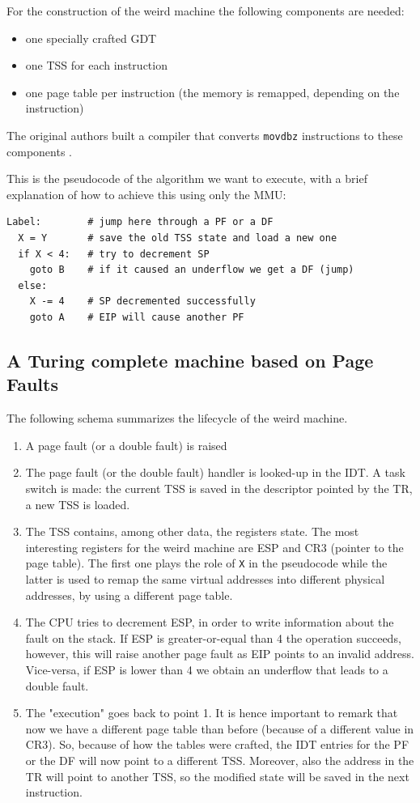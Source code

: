 \documentclass[11pt,twoside,a4paper]{article}
\begin{document}
For the construction of the weird machine the following components are needed:
\begin{itemize}
\item one specially crafted GDT
\item one TSS for each instruction
\item one page table per instruction (the memory is remapped, depending on the instruction)
\end{itemize}

The original authors built a compiler that converts \texttt{movdbz} instructions to these components \cite{trapcc}.

This is the pseudocode of the algorithm we want to execute, with a brief explanation of how to achieve this using only the MMU:
\begin{lstlisting}
Label:        # jump here through a PF or a DF
  X = Y       # save the old TSS state and load a new one
  if X < 4:   # try to decrement SP
    goto B    # if it caused an underflow we get a DF (jump)
  else:
    X -= 4    # SP decremented successfully
    goto A    # EIP will cause another PF
\end{lstlisting}


\subsection{A Turing complete machine based on Page Faults}

The following schema summarizes the lifecycle of the weird machine.

\begin{enumerate}
\item A page fault (or a double fault) is raised
\item The page fault (or the double fault) handler is looked-up in the IDT. A task switch is made: the current TSS is saved in the descriptor pointed by the TR, a new TSS is loaded.
\item The TSS contains, among other data, the registers state. The most interesting registers for the weird machine are ESP and CR3 (pointer to the page table). The first one plays the role of \texttt{X} in the pseudocode while the latter is used to remap the same virtual addresses into different physical addresses, by using a different page table.
\item The CPU tries to decrement ESP, in order to write information about the fault on the stack. If ESP is greater-or-equal than 4 the operation succeeds, however, this will raise another page fault as EIP points to an invalid address. Vice-versa, if ESP is lower than 4 we obtain an underflow that leads to a double fault.
\item The "execution" goes back to point 1. It is hence important to remark that now we have a different page table than before (because of a different value in CR3). So, because of how the tables were crafted, the IDT entries for the PF or the DF will now point to a different TSS. Moreover, also the address in the TR will point to another TSS, so the modified state will be saved in the next instruction.
\end{enumerate}
\end{document}
